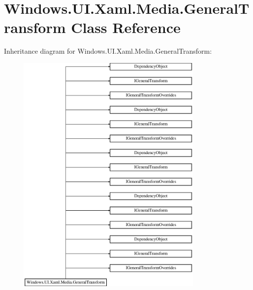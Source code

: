 \hypertarget{class_windows_1_1_u_i_1_1_xaml_1_1_media_1_1_general_transform}{}\section{Windows.\+U\+I.\+Xaml.\+Media.\+General\+Transform Class Reference}
\label{class_windows_1_1_u_i_1_1_xaml_1_1_media_1_1_general_transform}
Inheritance diagram for Windows.\+U\+I.\+Xaml.\+Media.\+General\+Transform\+:\begin{figure}[H]
\begin{center}
\leavevmode
\includegraphics[height=12.000000cm]{class_windows_1_1_u_i_1_1_xaml_1_1_media_1_1_general_transform}
\end{center}
\end{figure}

